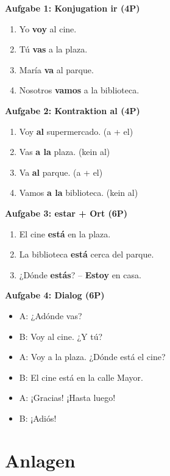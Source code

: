 \documentclass[11pt,a4paper]{article}
\begin{document}
\textbf{Aufgabe 1: Konjugation ir (4P)}
\begin{enumerate}[label=\alph*)]
    \item Yo \textbf{voy} al cine.
    \item Tú \textbf{vas} a la plaza.
    \item María \textbf{va} al parque.
    \item Nosotros \textbf{vamos} a la biblioteca.
\end{enumerate}

\textbf{Aufgabe 2: Kontraktion al (4P)}
\begin{enumerate}[label=\alph*)]
    \item Voy \textbf{al} supermercado. (a + el)
    \item Vas \textbf{a la} plaza. (kein al)
    \item Va \textbf{al} parque. (a + el)
    \item Vamos \textbf{a la} biblioteca. (kein al)
\end{enumerate}

\textbf{Aufgabe 3: estar + Ort (6P)}
\begin{enumerate}[label=\alph*)]
    \item El cine \textbf{está} en la plaza.
    \item La biblioteca \textbf{está} cerca del parque.
    \item ¿Dónde \textbf{estás}? -- \textbf{Estoy} en casa.
\end{enumerate}

\textbf{Aufgabe 4: Dialog (6P)}
\begin{itemize}
    \item A: ¿Adónde vas?
    \item B: Voy al cine. ¿Y tú?
    \item A: Voy a la plaza. ¿Dónde está el cine?
    \item B: El cine está en la calle Mayor.
    \item A: ¡Gracias! ¡Hasta luego!
    \item B: ¡Adiós!
\end{itemize}

\section{Anlagen}
\end{document}
